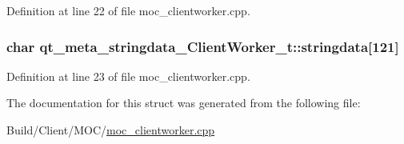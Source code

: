 Definition at line 22 of file moc\+\_\+clientworker.\+cpp.

\hypertarget{structqt__meta__stringdata___client_worker__t_a268ad3938620d0f0dc1a1b717fb62f2d}{}
\subsubsection[{stringdata}]{\setlength{\rightskip}{0pt plus 5cm}char qt\+\_\+meta\+\_\+stringdata\+\_\+\+Client\+Worker\+\_\+t\+::stringdata\mbox{[}121\mbox{]}}\label{structqt__meta__stringdata___client_worker__t_a268ad3938620d0f0dc1a1b717fb62f2d}


Definition at line 23 of file moc\+\_\+clientworker.\+cpp.



The documentation for this struct was generated from the following file\+:\begin{DoxyCompactItemize}
\item 
Build/\+Client/\+M\+O\+C/\hyperlink{moc__clientworker_8cpp}{moc\+\_\+clientworker.\+cpp}\end{DoxyCompactItemize}
